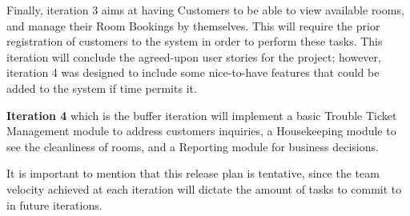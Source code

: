 Finally, iteration 3 aims at having Customers to be able to view available rooms, and manage their Room Bookings by themselves. This will require the prior registration of customers to the system in order to perform these tasks. This iteration will conclude the agreed-upon user stories for the project; however, iteration 4 was designed to include some nice-to-have features that could be added to the system if time permits it.

\textbf{Iteration 4} which is the buffer iteration will implement a basic Trouble Ticket Management module to address customers inquiries, a Housekeeping module to see the cleanliness of rooms, and a Reporting module for business decisions.

It is important to mention that this release plan is tentative, since the team velocity achieved at each iteration will dictate the amount of tasks to commit to in future iterations. 
